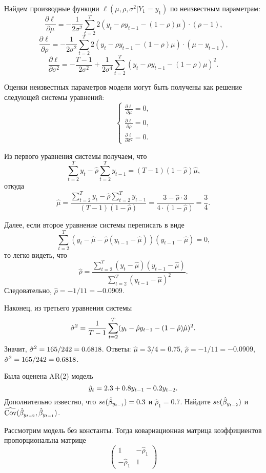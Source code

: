\begin{problem}
\begin{sol}
\begin{enumerate}
Найдем производные функции $\ell(\mu, \rho, \sigma^2|Y_1 = y_1)$ по неизвестным параметрам:
\[
\frac{\partial \ell}{\partial \mu} = -\frac{1}{2\sigma^2} \sum_{t=2}^{T} 2(y_t - \rho y_{t-1} - (1 - \rho) \mu) \cdot (\rho - 1) \text{,}
\]
\[
\frac{\partial \ell}{\partial \rho} = -\frac{1}{2\sigma^2} \sum_{t=2}^{T} 2(y_t - \rho y_{t-1} - (1 - \rho) \mu) \cdot (\mu - y_{t-1}) \text{,}
\]
\[
\frac{\partial \ell}{\partial {\sigma^2}} =  - \frac{T-1}{2\sigma^2} + \frac{1}{2\sigma^4} \sum_{t=2}^{T}(y_t - \rho y_{t-1} - (1 - \rho) \mu)^2 \text{.}
\]

Оценки неизвестных параметров модели могут быть получены как решение следующей системы уравнений:
\[
\left\{
  \begin{aligned}
    \frac{\partial \ell}{\partial \mu} = 0 \text{,} \\
    \frac{\partial \ell}{\partial \rho} = 0 \text{,} \\
    \frac{\partial \ell}{\partial {\sigma^2}} = 0 \text{.}
  \end{aligned}
\right.
\]

Из первого уравнения системы получаем, что
\[
\sum_{t=2}^{T}y_{t} - \hat{\rho} \sum_{t=2}^{T}y_{t-1} = (T - 1) (1- \hat{\rho}) \hat{\mu} \text{,}
\]
откуда
\[
\hat{\mu} = \frac{\sum_{t=2}^{T}y_{t} - \hat{\rho} \sum_{t=2}^{T}y_{t-1}}{(T - 1) (1- \hat{\rho})} = \frac{3 - \hat{\rho} \cdot 3}{4\cdot(1-\hat{\rho})} = \frac{3}{4} \text{.}
\]

Далее, если второе уравнение системы переписать в виде
\[
\sum_{t=2}^{T}(y_t - \hat{\mu} - \hat{\rho} (y_{t-1} - \hat{\mu}))(y_{t-1} - \hat{\mu}) = 0 \text{,}
\]
то легко видеть, что
\[
\hat{\rho} = \frac{\sum_{t=2}^{T}(y_t - \hat{\mu})(y_{t-1} - \hat{\mu})}{\sum_{t=2}^{T}(y_{t-1} - \hat{\mu})^2} \text{.}
\]
Следовательно, $\hat{\rho} =-1/11= -0.0909$.

Наконец, из третьего уравнения системы
\[
\hat{\sigma}^2 =\frac{1}{T-1} \sum_{t=2}^{T}(y_t - \hat{\rho} y_{t-1} - (1 - \hat{\rho}) \hat{\mu})^2 \text{.}
\]
Значит, $\hat{\sigma}^2 = 165/242= 0.6818$. Ответы: $\hat{\mu} = 3/4= 0.75$, $\hat{\rho} = -1/11=-0.0909$, $\hat{\sigma}^2 =165/242=0.6818$.
\end{enumerate}
\end{sol}
\end{problem}



\begin{problem}
Была оценена AR(2) модель
\[
\hat{y}_t=2.3+0.8 y_{t-1}-0.2 y_{t-2}.
\]
Дополнительно известно, что $se(\hat{\beta}_{y_{t-1}})=0.3$ и $\hat{\rho}_1=0.7$. Найдите $se(\hat{\beta}_{y_{t-2}})$ и $\widehat{\operatorname{Cov}}(\hat{\beta}_{y_{t-2}},\hat{\beta}_{y_{t-1}})$.


\begin{sol}
Рассмотрим модель без константы. Тогда ковариационная матрица коэффициентов пропорциональна матрице
\[
\begin{pmatrix}
1 & -\hat{\rho}_1 \\
-\hat{\rho}_1 & 1
\end{pmatrix}
\]
\end{sol}
\end{problem}




